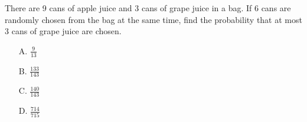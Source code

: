 There are 9 cans of apple juice and 3 cans of grape juice in a bag. If 6 cans are randomly chosen from the bag at the same time, find the probability that at most 3 cans of grape juice are chosen.
    \begin{itemize}
        \item[A.] $\frac{9}{13}$
        \item[B.] $\frac{133}{143}$
        \item[C.] $\frac{140}{143}$
        \item[D.] $\frac{714}{715}$
    \end{itemize}



